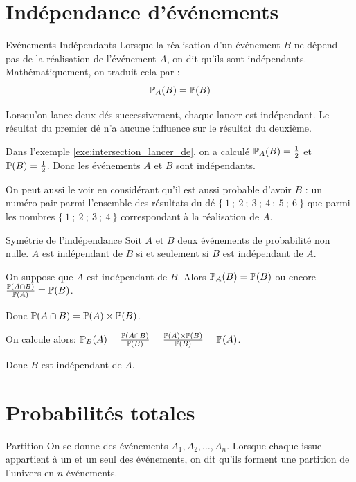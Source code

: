 \documentclass[10pt,a4paper,openany,twoside]{book}
\begin{document}
\section{Indépendance d'événements}
\begin{defi}{Evénements Indépendants}{}
    Lorsque la réalisation d'un événement $B$ ne dépend pas de la réalisation de l'événement $A$, on dit qu'ils sont indépendants. Mathématiquement, on traduit cela par :
    $$\P_A(B) = \P(B)$$
\end{defi}

\begin{ex}{}{}
    Lorsqu'on lance deux dés successivement, chaque lancer est indépendant. Le résultat du premier dé n'a aucune influence sur le résultat du deuxième.

    Dans l'exemple \ref{exe:intersection_lancer_de}, on a calculé $\P_A(B) = \frac{1}{2}$ et $\P(B)=\frac{1}{2}$. Donc les événements $A$ et $B$ sont indépendants.

    On peut aussi le voir en considérant qu'il est aussi probable d'avoir $B$ : \og un numéro pair \fg{} parmi l'ensemble des résultats du dé $\{~1~;~2~;~3~;~4~;~5~;~6~\}$ que parmi les nombres $\{~1~;~2~;~3~;~4~\}$ correspondant à la réalisation de $A$.
\end{ex}

\begin{prop}{Symétrie de l'indépendance}{}
    Soit $A$ et $B$ deux événements de probabilité non nulle. $A$ est indépendant de $B$ si et seulement si $B$ est indépendant de $A$.
\end{prop}

\begin{dem}{}{}
    On suppose que $A$ est indépendant de $B$. Alors $\P_A(B) = \P(B)$ ou encore $\frac{\P(A\cap B)}{\P(A)} = \P(B)$.

    Donc $\P(A\cap B) = \P(A) \times \P(B)$.

    On calcule alors: $\P_B(A) = \frac{\P(A\cap B)}{\P(B)} = \frac{\P(A) \times \P(B)}{\P(B)} = \P(A)$.

    Donc $B$ est indépendant de $A$.
\end{dem}

\section{Probabilités totales}
\begin{defi}{Partition}{}
  On se donne des événements $A_1, A_2, \dots, A_n$. Lorsque chaque issue appartient à un et un seul des événements, on dit qu'ils forment une partition de l'univers en $n$ événements.
\end{defi}
\end{document}
